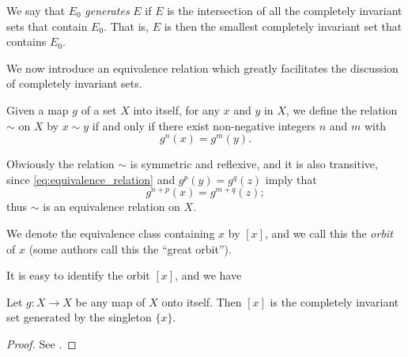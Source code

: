 \begin{definition}
    We say that $E_0$ \emph{generates} $E$ if $E$ is the intersection of all the
    completely invariant sets that contain $E_0$. That is, $E$ is then the
    smallest completely invariant set that contains $E_0$.
\end{definition}

We now introduce an equivalence relation which greatly facilitates the
discussion of completely invariant sets.

\begin{definition}
    Given a map $g$ of a set $X$ into itself, for any $x$ and $y$ in $X$, we
    define the relation $\sim$ on $X$ by $x \sim y$ if and only if there exist
    non-negative integers $n$ and $m$ with
    \begin{equation}
        \label{eq:equivalence_relation}
        g^n(x) = g^m(y).
    \end{equation}
\end{definition}

\begin{remark}
    Obviously the relation $\sim$ is symmetric and reflexive, and it is also
    transitive, since \eqref{eq:equivalence_relation} and $g^p(y) = g^q(z)$ imply
    that
    \begin{equation*}
        g^{n+p}(x) = g^{m+q}(z);
    \end{equation*}
    thus $\sim$ is an equivalence relation on $X$.
\end{remark}

\begin{definition}
    We denote the equivalence class containing $x$ by $[x]$, and we call this
    the \emph{orbit} of $x$ (some authors call this the \enquote{great orbit}).
\end{definition}

It is easy to identify the orbit $[x]$, and we have

\begin{theorem}
    Let $g: X \to X$ be any map of $X$ onto itself. Then $[x]$ is the completely
    invariant set generated by the singleton $\{x\}$.
\end{theorem}
\begin{proof}
    See \cite[53]{Beardon1991}.
\end{proof}

